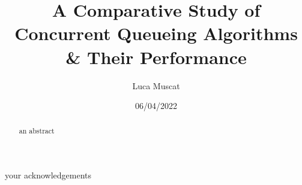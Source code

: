 \documentclass[12pt, a4paper]{report}
\newenvironment{code}
{\footnotesize\verbatim}{\endverbatim\normalfont}
\theoremstyle{definition}
\newtheorem{definition}{Definition}[section]
\theoremstyle{definition}%
\newtheorem{example}{Example}[section]
\theoremstyle{definition}%
\theoremstyle{definition}%
\theoremstyle{definition}%
\theoremstyle{definition}%
\begin{document}
\title{A Comparative Study of Concurrent Queueing Algorithms \& Their Performance}
\author{Luca Muscat}
\date{06/04/2022}

\frontmatter


\begin{acknowledgements}
your acknowledgements
\end{acknowledgements}
       
\begin{abstract}
an abstract
\end{abstract}

\tableofcontents
\listoffigures
\listoftables

\mainmatter











\appendix


\bibliomatter


 
\end{document}
